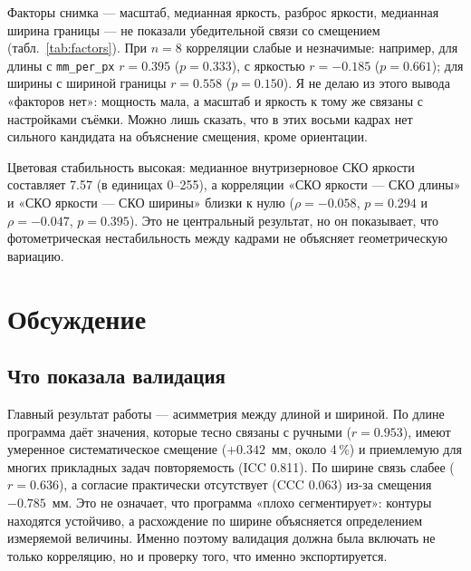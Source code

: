 \documentclass[12pt,a4paper]{article}
\begin{document}
Факторы снимка — масштаб, медианная яркость, разброс яркости, медианная
ширина границы — не показали убедительной связи со смещением
(табл.~\ref{tab:factors}). При $n = 8$ корреляции слабые и
незначимые: например, для длины с \texttt{mm\_per\_px} $r = \num{0.395}$
($p = \num{0.333}$), с яркостью $r = \num{-0.185}$ ($p = \num{0.661}$);
для ширины с шириной границы $r = \num{0.558}$ ($p = \num{0.150}$).
Я не делаю из этого вывода «факторов нет»: мощность мала, а масштаб и
яркость к тому же связаны с настройками съёмки. Можно лишь сказать, что
в этих восьми кадрах нет сильного кандидата на объяснение смещения,
кроме ориентации.

\begin{table}[htbp]
\centering\scriptsize
\setlength{\tabcolsep}{3pt}
\caption{Факторы снимков и смещения (средние по снимку).}
\label{tab:factors}

\end{table}

Цветовая стабильность высокая: медианное внутризерновое СКО яркости
составляет \num{7.57} (в единицах 0--255), а корреляции «СКО яркости —
СКО длины» и «СКО яркости — СКО ширины» близки к нулю
($\rho = \num{-0.058}$, $p = \num{0.294}$ и $\rho = \num{-0.047}$,
$p = \num{0.395}$). Это не центральный результат, но он показывает, что
фотометрическая нестабильность между кадрами не объясняет
геометрическую вариацию.

\section{Обсуждение}

\subsection{Что показала валидация}

Главный результат работы — асимметрия между длиной и шириной. По длине
программа даёт значения, которые тесно связаны с ручными
($r = \num{0.953}$), имеют умеренное систематическое смещение
($+\num{0.342}$~мм, около \num{4}\,\%) и приемлемую для многих
прикладных задач повторяемость (ICC \num{0.811}). По ширине связь
слабее ($r = \num{0.636}$), а согласие практически отсутствует
(CCC \num{0.063}) из-за смещения $-\num{0.785}$~мм. Это не означает,
что программа «плохо сегментирует»: контуры находятся устойчиво, а
расхождение по ширине объясняется определением измеряемой величины.
Именно поэтому валидация должна была включать не только корреляцию, но
и проверку того, что именно экспортируется.
\end{document}
